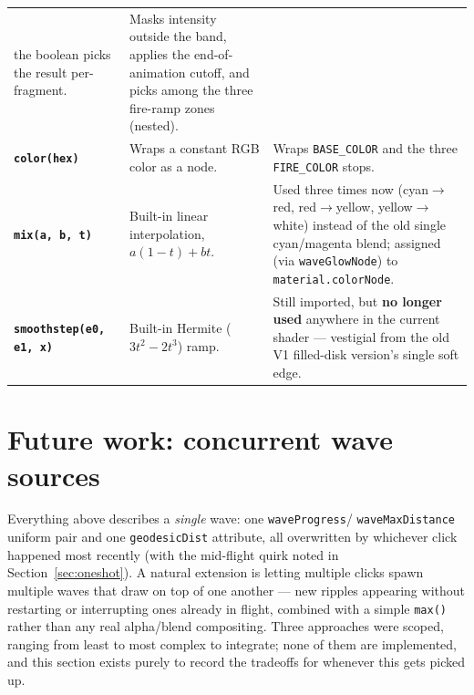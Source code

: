 \documentclass[11pt]{article}
\newcommand{\code}[1]{\texttt{#1}}
\newcommand{\func}[1]{\texttt{\textbf{#1}}}
\begin{document}
\begin{center}
\begin{tabular}{@{}p{2.7cm}p{3.6cm}p{7.1cm}@{}}
  the boolean picks the result per-fragment. & Masks intensity outside the band, applies
  the end-of-animation cutoff, and picks among the three fire-ramp zones (nested). \\
\func{color(hex)} & Wraps a constant RGB color as a node. & Wraps \code{BASE\_COLOR} and
  the three \code{FIRE\_COLOR} stops. \\
\func{mix(a, b, t)} & Built-in linear interpolation, $a(1{-}t)+bt$. & Used three times now
  (cyan$\to$red, red$\to$yellow, yellow$\to$white) instead of the old single
  cyan/magenta blend; assigned (via \code{waveGlowNode}) to \code{material.colorNode}. \\
\func{smoothstep(e0, e1, x)} & Built-in Hermite ($3t^2{-}2t^3$) ramp. & Still imported, but
  \textbf{no longer used} anywhere in the current shader --- vestigial from the old V1
  filled-disk version's single soft edge. \\
\bottomrule
\end{tabular}
\end{center}

\section{Future work: concurrent wave sources}
\label{sec:future}

Everything above describes a \emph{single} wave: one \code{waveProgress}/
\code{waveMaxDistance} uniform pair and one \code{geodesicDist} attribute, all overwritten
by whichever click happened most recently (with the mid-flight quirk noted in
Section~\ref{sec:oneshot}). A natural extension is letting multiple clicks spawn multiple
waves that draw on top of one another --- new ripples appearing without restarting or
interrupting ones already in flight, combined with a simple \code{max()} rather than any
real alpha/blend compositing. Three approaches were scoped, ranging from least to most
complex to integrate; none of them are implemented, and this section exists purely to
record the tradeoffs for whenever this gets picked up.
\end{document}
